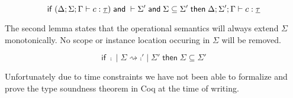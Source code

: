 {\begin{lemma}
\[
	\mathsf{if}\;
		(\Delta;\Sigma;\Gamma \vdash c : \underline{\tau})
		\;\mathsf{and}\;
		\vdash \Sigma'
		\;\mathsf{and}\;
		\Sigma \subseteq \Sigma'
	\;\mathsf{then}\;
		\Delta;\Sigma';\Gamma \vdash c : \underline{\tau}
\]
\end{lemma}

The second lemma states that the operational semantics will always extend $\Sigma$ monotonically.
No scope or instance location occuring in $\Sigma$ will be removed.

\begin{lemma}
\[
	\mathsf{if}\;
		\comp \;|\; \Sigma \rightsquigarrow \comp' \;|\; \Sigma'
	\;\mathsf{then}\;
		\Sigma \subseteq \Sigma'
\]
\end{lemma}

Unfortunately due to time constraints we have not been able to formalize and prove the type soundness theorem in Coq at the time of writing.

}
